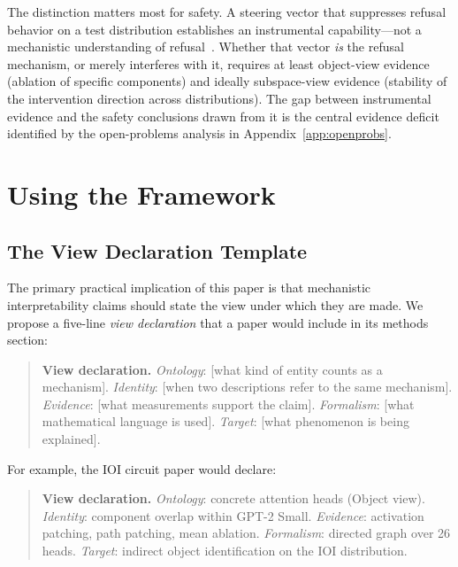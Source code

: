 \documentclass{article}
\begin{document}
The distinction matters most for safety.  A steering vector that
suppresses refusal behavior on a test distribution establishes an
instrumental capability---not a mechanistic understanding of
refusal~\citep{turner2024}.  Whether that vector \emph{is} the refusal
mechanism, or merely interferes with it, requires at least object-view
evidence (ablation of specific components) and ideally subspace-view
evidence (stability of the intervention direction across distributions).
The gap between instrumental evidence and the safety conclusions drawn
from it is the central evidence deficit identified by the open-problems
analysis in Appendix~\ref{app:openprobs}.


\section{Using the Framework}\label{sec:implications}

\subsection{The View Declaration Template}

The primary practical implication of this paper is that mechanistic
interpretability claims should state the view under which they are made.
We propose a five-line \emph{view declaration} that a paper would
include in its methods section:

\begin{quote}
\small
\textbf{View declaration.}
\emph{Ontology}: [what kind of entity counts as a mechanism].
\emph{Identity}: [when two descriptions refer to the same mechanism].
\emph{Evidence}: [what measurements support the claim].
\emph{Formalism}: [what mathematical language is used].
\emph{Target}: [what phenomenon is being explained].
\end{quote}

For example, the IOI circuit paper \citep{wang2022} would declare:

\begin{quote}
\small
\textbf{View declaration.}
\emph{Ontology}: concrete attention heads (Object view).
\emph{Identity}: component overlap within GPT-2 Small.
\emph{Evidence}: activation patching, path patching, mean ablation.
\emph{Formalism}: directed graph over 26 heads.
\emph{Target}: indirect object identification on the IOI distribution.
\end{quote}
\end{document}
